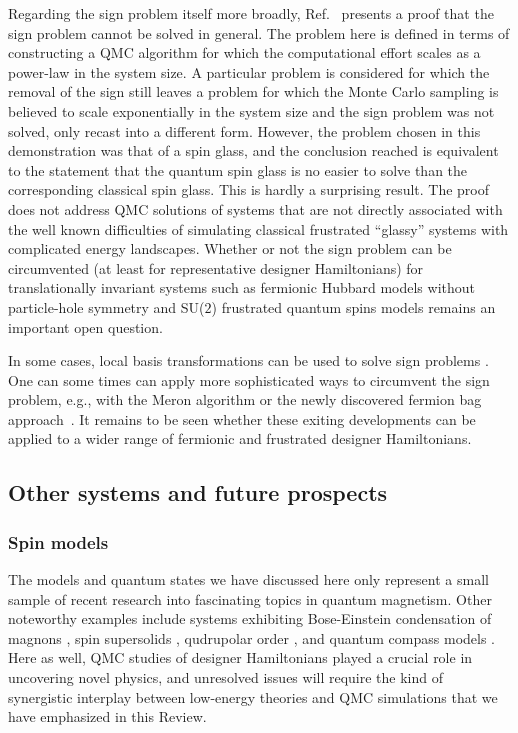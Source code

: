 \documentclass[10pt,pre,aps,twocolumn,showpacs,subscriptaddresses,floatfix]{revtex4}
\begin{document}
Regarding the sign problem itself more broadly, Ref.~\cite{Troyer05} presents a proof that the sign problem cannot be solved in general. 
The problem here is defined in terms of constructing a QMC algorithm for which the computational effort scales as a power-law in the system
size. A particular problem is considered for which the removal of the sign still leaves a problem for which the Monte Carlo sampling is believed 
to scale exponentially in the system size and the sign problem was not solved, only recast into a different form. However, the problem chosen in
this demonstration was that of a spin glass, and the conclusion reached is equivalent to the statement that the quantum spin glass is no easier 
to solve than the corresponding classical spin glass. This is hardly a surprising result. The proof does not address QMC solutions of systems that 
are not directly associated with the well known difficulties of simulating classical frustrated ``glassy'' systems with complicated energy 
landscapes. Whether or not the sign problem can be circumvented (at least for representative designer Hamiltonians) for translationally invariant 
systems such as fermionic Hubbard models without particle-hole symmetry and SU($2$) frustrated quantum spins models remains an important open question.

In some cases, local basis transformations can be used to solve sign problems \cite{Nakamura97}. One can some times can apply more sophisticated ways to circumvent 
the sign problem, e.g., with the Meron algorithm \cite{Chandrasekharan99} or the newly discovered fermion bag approach~\cite{chandrasekharan2010:fbag}.
It remains to be seen whether these exiting developments can be applied to a wider range of fermionic and frustrated designer Hamiltonians.

\subsection{Other systems and future prospects}

\subsubsection{Spin models}

The models and quantum states we have discussed here only represent a small sample of recent research into fascinating topics in quantum magnetism. Other 
noteworthy examples include systems exhibiting Bose-Einstein condensation of magnons \cite{Nohadani04}, spin supersolids \cite{Sengupta07}, qudrupolar order 
\cite{Harada02b,Harada07}, and quantum compass models \cite{Wenzel08b}. Here as well, QMC studies of designer Hamiltonians played a crucial role 
in uncovering novel physics, and unresolved issues will require the kind of synergistic interplay between low-energy theories and QMC simulations that 
we have emphasized in this Review.
\end{document}
